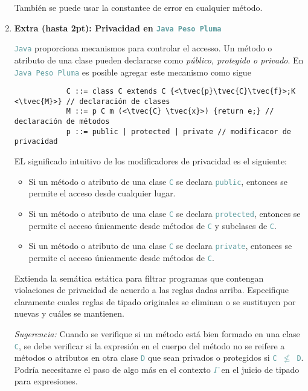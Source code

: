 \documentclass{article}
\newcommand{\tx}[1]{\textcolor{CadetBlue} {\texttt{#1}}}
\newcommand{\tb}[1]{\textcolor{RoyalPurple} {\textbf{#1}}}
\newcommand{\ti}[1]{\textcolor{RoyalPurple} {\textit{#1}}}
\newcommand{\pt}[1]{\textcolor{RoyalPurple}{(#1pt)}}
\newcommand{\tvec}[1]{$\vec{\tx{#1}}$ }
\begin{document}
\begin{enumerate}
        También se puede usar la constantee de error en cualquier método.

        \item \tb{Extra \pt{hasta 2}: Privacidad en \tx{Java Peso Pluma}}

        \tx{Java} proporciona mecanismos para controlar el accesso. Un método o
        atributo de una clase pueden declararse como \ti{público, protegido o 
        privado}. En \tx{Java Peso Pluma} es posible agregar este mecanismo como
        sigue

        \begin{verbatim}
            C ::= class C extends C {<\tvec{p}\tvec{C}\tvec{f}>;K <\tvec{M}>} // declaración de clases
            M ::= p C m (<\tvec{C} \tvec{x}>) {return e;} // declaración de métodos
            p ::= public | protected | private // modificacor de privacidad
        \end{verbatim}

        EL significado intuitivo de los modificadores de privacidad es el 
        siguiente:

        \begin{itemize}
            \item Si un método o atributo de una clase \tx{C} se declara 
            \tx{public}, entonces se permite el acceso desde cualquier lugar.

            \item Si un método o atributo de una clase \tx{C} se declara 
            \tx{protected}, entonces se permite el acceso únicamente desde
            métodos de \tx{C} y subclases de \tx{C}.

            \item Si un método o atributo de una clase \tx{C} se declara 
            \tx{private}, entonces se permite el acceso únicamente desde
            métodos de \tx{C}.
        \end{itemize}

        Extienda la semática estática para filtrar programas que contengan 
        violaciones de privacidad de acuerdo a las reglas dadas arriba. 
        Especifique claramente cuales reglas de tipado originales se eliminan o 
        se sustituyen por nuevas y cuáles se mantienen.

        \ti{Sugerencia:} Cuando se verifique si un método está bien formado en 
        una clase \tx{C}, se debe verificar si la expresión en el cuerpo del 
        método no se reifere a métodos o atributos en otra clase \tx{D} que sean
        privados o protegidos si \tx{C $\not \leq$ D}. Podría necesitarse el 
        paso de algo más en el contexto \tx{$\Gamma$} en el juicio de tipado 
        para expresiones.

    \end{enumerate}
\end{document}
